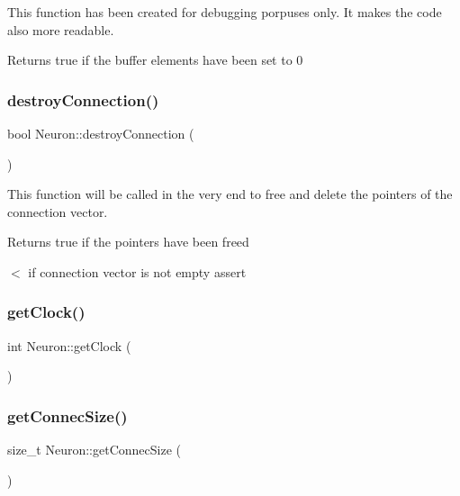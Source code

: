 This function has been created for debugging porpuses only. It makes the code also more readable. \begin{DoxyReturn}{Returns}
true if the buffer elements have been set to 0 
\end{DoxyReturn}
\mbox{\label{class_neuron_a77b6781a4864753504cb6c26f00c61a2}} 
\subsubsection{destroy\+Connection()}
{\footnotesize\ttfamily bool Neuron\+::destroy\+Connection (\begin{DoxyParamCaption}{ }\end{DoxyParamCaption})}

This function will be called in the very end to free and delete the pointers of the connection vector. \begin{DoxyReturn}{Returns}
true if the pointers have been freed 
\end{DoxyReturn}
$<$ if connection vector is not empty assert \mbox{\label{class_neuron_a0c6f3326a19ca4623f7a53b4b82e69ce}} 
\subsubsection{get\+Clock()}
{\footnotesize\ttfamily int Neuron\+::get\+Clock (\begin{DoxyParamCaption}{ }\end{DoxyParamCaption})\hspace{0.3cm}{\ttfamily [inline]}}

\mbox{\label{class_neuron_a68bd47e91a15162f7ce767c5350260f2}} 
\subsubsection{get\+Connec\+Size()}
{\footnotesize\ttfamily size\+\_\+t Neuron\+::get\+Connec\+Size (\begin{DoxyParamCaption}{ }\end{DoxyParamCaption})\hspace{0.3cm}{\ttfamily [inline]}}

\mbox{\label{class_neuron_a94672ed8219d66ee2fa6c73bec1c775b}} 

